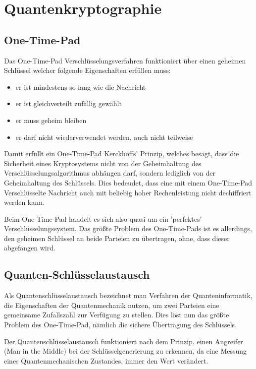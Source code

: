 
\section{Quantenkryptographie}
\label{sec:Quantenkryptographie}

\subsection{One-Time-Pad}

Das One-Time-Pad Verschlüsselungsverfahren funktioniert über einen geheimen Schlüssel welcher folgende Eigenschaften erfüllen muss: \cite{ontetimepadwiki}
\begin{itemize}
    \item er ist mindestens so lang wie die Nachricht
    \item er ist gleichverteilt zufällig gewählt
    \item er muss geheim bleiben
    \item er darf nicht wiederverwendet werden, auch nicht teilweise
\end{itemize}

Damit erfüllt ein One-Time-Pad Kerckhoffs’ Prinzip, welches besagt, dass die Sicherheit eines Kryptosystems nicht von der Geheimhaltung des Verschlüsselungsalgorithmus abhängen darf, sondern lediglich von der Geheimhaltung des Schlüssels.\cite{ontetimepadwiki}
Dies bedeudet, dass eine mit einem One-Time-Pad Verschlüsselte Nachricht auch mit beliebig hoher Rechenleistung nicht dechiffriert werden kann.

Beim One-Time-Pad handelt es sich also quasi um ein 'perfektes' Verschlüsselungssystem.
Das größte Problem des One-Time-Pads ist es allerdings, den geheimen Schlüssel an beide Parteien zu übertragen, ohne, dass dieser abgefangen wird.

\subsection{Quanten-Schlüsselaustausch}
\label{sec:Quanten-Schlusselaustausch}

Als Quantenschlüsselaustausch bezeichnet man Verfahren der Quanteninformatik, die Eigenschaften der Quantenmechanik nutzen, um zwei Parteien eine gemeinsame Zufallszahl zur Verfügung zu stellen.
Dies löst nun das größte Problem des One-Time-Pad, nämlich die sichere Übertragung des Schlüssels.

Der Quantenschlüsselaustausch funktioniert nach dem Prinzip, einen Angreifer (Man in the Middle) bei der Schlüsselgenerierung zu erkennen, da eine Messung eines Quantenmechanischen Zustandes, immer den Wert verändert.

